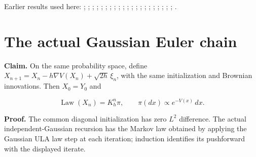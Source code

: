 \documentclass[11pt,a4paper]{article}
\begin{document}
Earlier results used here: \cite[Section~3.17.2]{LangevinLean2026ULASC}; \cite[Section~3.19.3]{LangevinLean2026ULASC}; \cite[Section~3.22.20]{LangevinLean2026ULASC}; \cite[Section~3.22.22]{LangevinLean2026ULASC}; \cite[Section~3.23.5]{LangevinLean2026ULASC}; \cite[Section~3.25.6]{LangevinLean2026ULASC}; \cite[Section~3.26.3]{LangevinLean2026ULASC}; \cite[Section~3.29.4]{LangevinLean2026ULASC}; \cite[Section~3.29.7]{LangevinLean2026ULASC}; \cite[Section~3.32.12]{LangevinLean2026ULASC}; \cite[Section~3.32.13]{LangevinLean2026ULASC}; \cite[Section~3.32.15]{LangevinLean2026ULASC}; \cite[Section~3.32.17]{LangevinLean2026ULASC}; \cite[Section~3.32.5]{LangevinLean2026ULASC}; \cite[Section~3.42.7]{LangevinLean2026ULASC}; \cite[Section~3.44.5]{LangevinLean2026ULASC}; \cite[Section~3.45.3]{LangevinLean2026ULASC}; \cite[Section~3.45.4]{LangevinLean2026ULASC}; \cite[Section~3.8.17]{LangevinLean2026ULASC}; \cite[Section~3.8.19]{LangevinLean2026ULASC}; \cite[Section~3.8.20]{LangevinLean2026ULASC}; \cite[Section~3.8.22]{LangevinLean2026ULASC}.

\section{\texorpdfstring{The actual Gaussian Euler chain}{The actual Gaussian Euler chain}}


\textbf{Claim.} On the same probability space, define \(X_{n+1}=X_n-h\nabla V(X_n)+\sqrt{2h}\,\xi_n\), with the same initialization and Brownian innovations. Then \(X_0=Y_0\) and

\[\operatorname{Law}(X_n)=K_h^n\pi,\qquad \pi(dx)\propto e^{-V(x)}\,dx.\]

\textbf{Proof.} The common diagonal initialization has zero \(L^2\) difference. The actual independent-Gaussian recursion has the Markov law obtained by applying the Gaussian ULA law step at each iteration; induction identifies its pushforward with the displayed iterate.
\end{document}
